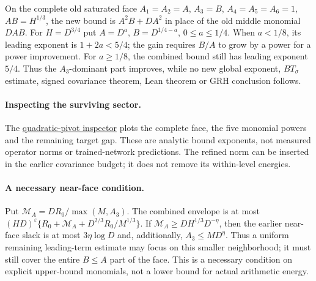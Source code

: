 On the complete old saturated face $A_1=A_2=A$, $A_3=B$,
$A_4=A_5=A_6=1$, $AB=H^{1/3}$, the new bound is
$A^2B+DA^2$ in place of the old middle monomial $DAB$.
For $H=D^{3/4}$ put $A=D^a$, $B=D^{1/4-a}$,
$0\le a\le1/4$. When $a<1/8$, its leading exponent is $1+2a<5/4$;
the gain requires $B/A$ to grow by a power for a power improvement.
For $a\ge1/8$, the combined bound still has leading exponent $5/4$.
Thus the $A_3$-dominant part improves, while no new global exponent,
$BT_\sigma$ estimate, signed covariance theorem, Lean theorem or GRH
conclusion follows.

\paragraph{Inspecting the surviving sector.}
The \href{https://amelie-iska.github.io/GRH-research/quadratic-pivot.html}{quadratic-pivot inspector} plots the complete face, the five monomial powers and the remaining target gap. These are analytic bound exponents, not measured operator norms or trained-network predictions. The refined norm can be inserted in the earlier covariance budget; it does not remove its within-level energies.

\paragraph{A necessary near-face condition.}\label{qp:near}
Put $\mathcal M_A=DR_0/\max(M,A_3)$.
The combined envelope is at most
$(HD)^\varepsilon\{R_0+\mathcal M_A+D^{2/3}R_0/M^{1/3}\}$.
If $\mathcal M_A\ge DH^{1/3}D^{-\eta}$, then the earlier
near-face slack is at most $3\eta\log D$ and, additionally,
$A_3\le M D^\eta$. Thus a uniform remaining leading-term estimate
may focus on this smaller neighborhood; it must still cover the entire
$B\le A$ part of the face. This is a necessary condition on explicit
upper-bound monomials, not a lower bound for actual arithmetic energy.
